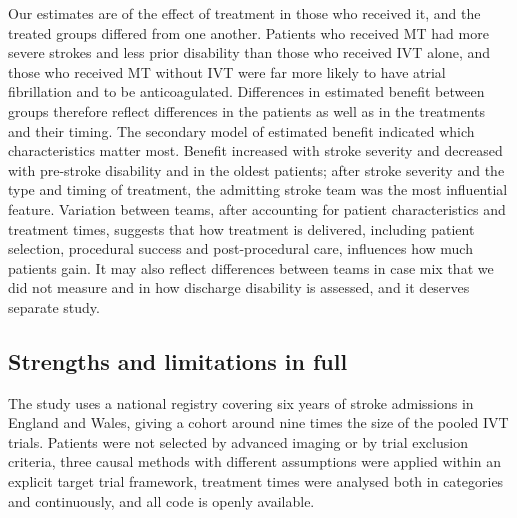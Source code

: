 Our estimates are of the effect of treatment in those who received it, and the treated groups differed from one another. Patients who received MT had more severe strokes and less prior disability than those who received IVT alone, and those who received MT without IVT were far more likely to have atrial fibrillation and to be anticoagulated. Differences in estimated benefit between groups therefore reflect differences in the patients as well as in the treatments and their timing. The secondary model of estimated benefit indicated which characteristics matter most. Benefit increased with stroke severity and decreased with pre-stroke disability and in the oldest patients; after stroke severity and the type and timing of treatment, the admitting stroke team was the most influential feature. Variation between teams, after accounting for patient characteristics and treatment times, suggests that how treatment is delivered, including patient selection, procedural success and post-procedural care, influences how much patients gain. It may also reflect differences between teams in case mix that we did not measure and in how discharge disability is assessed, and it deserves separate study.


\subsection{Strengths and limitations in full}\label{sec:supp_limitations}

The study uses a national registry covering six years of stroke admissions in England and Wales, giving a cohort around nine times the size of the pooled IVT trials. Patients were not selected by advanced imaging or by trial exclusion criteria, three causal methods with different assumptions were applied within an explicit target trial framework, treatment times were analysed both in categories and continuously, and all code is openly available.

